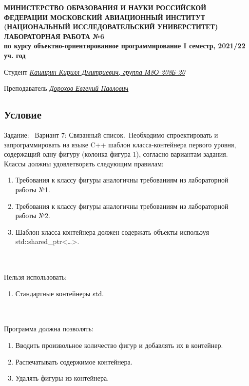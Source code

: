 \documentclass[12pt]{article}
\begin{document}
\begin{titlepage}
\begin{center}
\textbf{МИНИСТЕРСТВО ОБРАЗОВАНИЯ И НАУКИ РОССИЙСКОЙ ФЕДЕРАЦИИ
\medskip
МОСКОВСКИЙ АВИАЦИОННЫЙ ИНСТИТУТ
(НАЦИОНАЛЬНЫЙ ИССЛЕДОВАТЕЛЬСКИЙ УНИВЕРСТИТЕТ)
\vfill\vfill
{\Huge ЛАБОРАТОРНАЯ РАБОТА №6} \\
по курсу объектно-ориентированное программирование
I семестр, 2021/22 уч. год}
\end{center}
\vfill

Студент \uline{\it {Каширин Кирилл Дмитриевич, группа М8О-208Б-20}\hfill}

Преподаватель \uline{\it {Дорохов Евгений Павлович}\hfill}

\vfill
\end{titlepage}

\subsection*{Условие}

Задание: \
Вариант 7: Связанный список.\
Необходимо спроектировать и запрограммировать на языке C++ шаблон класса-контейнера первого уровня, содержащий одну фигуру (колонка фигура 1), согласно вариантам задания. Классы должны удовлетворять следующим правилам:
\begin{enumerate}
\item Требования к классу фигуры аналогичны требованиям из лабораторной работы №1.
\item Требования к классу фигуры аналогичны требованиям из лабораторной работы №2.
\item Шаблон класса-контейнера должен содержать объекты используя std::shared\_ptr<…>.
\end{enumerate}
\\ \\
Нельзя использовать:
\begin{enumerate}
\item Стандартные контейнеры std.
\end{enumerate}
\\ \\
Программа должна позволять:
\begin{enumerate}
\item Вводить произвольное количество фигур и добавлять их в контейнер.
\item Распечатывать содержимое контейнера.
\item Удалять фигуры из контейнера.
\end{enumerate}
\end{document}
